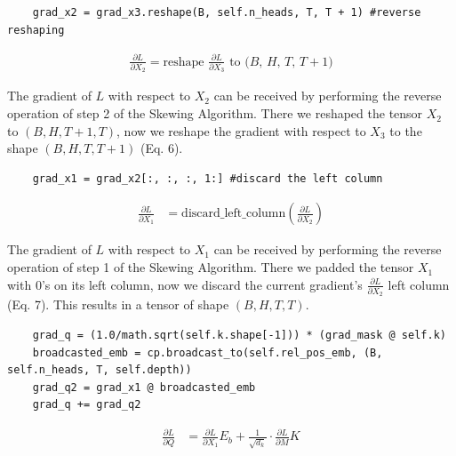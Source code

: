 \documentclass[a4paper,12pt]{extarticle}
\begin{document}
\begin{lstlisting}
    grad_x2 = grad_x3.reshape(B, self.n_heads, T, T + 1) #reverse reshaping
\end{lstlisting}
\begin{align}
\frac{\partial L}{\partial X_2}=\text{reshape } \frac{\partial L}{\partial X_3} \text{ to ($B$, $H$, $T$, $T + 1$)}
\end{align}

The gradient of $L$ with respect to $X_2$ can be received by performing the reverse operation of step 2 of the Skewing Algorithm. There we reshaped the tensor $X_2$ to $(B, H, T + 1, T)$, now we reshape the gradient with respect to $X_3$ to the shape $(B, H, T, T + 1)$ (Eq. 6).\newline
\vspace{0.1 cm}

\begin{lstlisting}
    grad_x1 = grad_x2[:, :, :, 1:] #discard the left column
\end{lstlisting}
\begin{align}
\frac{\partial L}{\partial X_1}&=\text{discard\_left\_column}\left(\frac{\partial L}{\partial X_2}\right)
\end{align}

The gradient of $L$ with respect to $X_1$ can be received by performing the reverse operation of step 1 of the Skewing Algorithm. There we padded the tensor $X_1$ with 0's on its left column, now we discard the current gradient's $\frac{\partial L}{\partial X_2}$ left column (Eq. 7). This results in a tensor of shape $(B, H, T, T)$.\newline
\vspace{0.1 cm}


\begin{lstlisting}
    grad_q = (1.0/math.sqrt(self.k.shape[-1])) * (grad_mask @ self.k)
    broadcasted_emb = cp.broadcast_to(self.rel_pos_emb, (B, self.n_heads, T, self.depth))
    grad_q2 = grad_x1 @ broadcasted_emb
    grad_q += grad_q2
\end{lstlisting}
\begin{align}
\frac{\partial L}{\partial Q}
&= \frac{\partial L}{\partial X_1}E_b + \frac{1}{\sqrt{d_k}} \cdot\frac{\partial L}{\partial M}K
\end{align}
\end{document}
